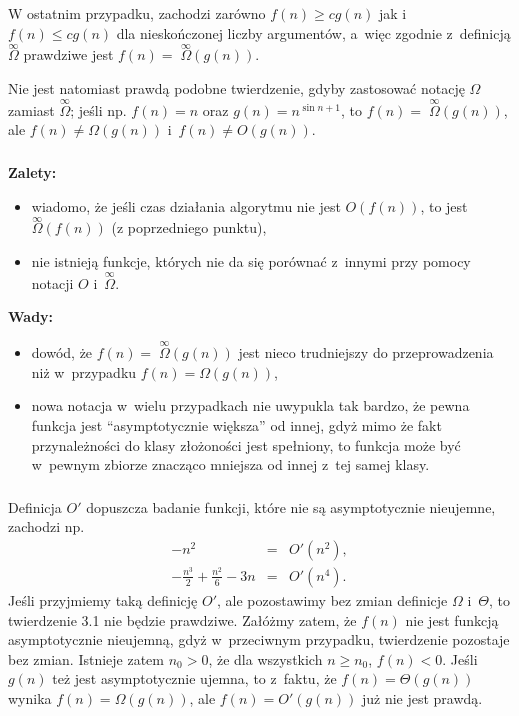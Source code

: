 W ostatnim przypadku, zachodzi zarówno $f(n)\ge cg(n)$ jak i~$f(n)\le cg(n)$ dla nieskończonej liczby argumentów, a~więc zgodnie z~definicją $\stackrel{\infty}{\Omega}$ prawdziwe jest $f(n)=\;\stackrel{\infty}{\Omega}\!\!(g(n))$.

Nie jest natomiast prawdą podobne twierdzenie, gdyby zastosować notację $\Omega$ zamiast $\stackrel{\infty}{\Omega}$; jeśli np. $f(n)=n$ oraz $g(n)=n^{\sin n+1}$, to $f(n)=\;\stackrel{\infty}{\Omega}\!\!(g(n))$, ale $f(n)\ne\Omega(g(n))$ i~$f(n)\ne O(g(n))$.

\subsubsection{} %
\textbf{Zalety:}
\begin{itemize}
	\item wiadomo, że jeśli czas działania algorytmu nie jest $O(f(n))$, to jest $\stackrel{\infty}{\Omega}\!\!(f(n))$ (z poprzedniego punktu),
	\item nie istnieją funkcje, których nie da się porównać z~innymi przy pomocy notacji $O$ i~$\stackrel{\infty}{\Omega}$.
\end{itemize}
\textbf{Wady:}
\begin{itemize}
	\item dowód, że $f(n)=\;\stackrel{\infty}{\Omega}\!\!(g(n))$ jest nieco trudniejszy do przeprowadzenia niż w~przypadku $f(n)=\Omega(g(n))$,
	\item nowa notacja w~wielu przypadkach nie uwypukla tak bardzo, że pewna funkcja jest ``asymptotycznie większa'' od innej, gdyż mimo że fakt przynależności do klasy złożoności jest spełniony, to funkcja może być w~pewnym zbiorze znacząco mniejsza od innej z~tej samej klasy.
\end{itemize}

\subsubsection{} %
Definicja $O'$ dopuszcza badanie funkcji, które nie są asymptotycznie nieujemne, zachodzi np.
\begin{eqnarray*}
	-n^2 &=& O'(n^2), \\
	-\frac{n^3}{2}+\frac{n^2}{6}-3n &=& O'(n^4).
\end{eqnarray*}
Jeśli przyjmiemy taką definicję $O'$, ale pozostawimy bez zmian definicje $\Omega$ i~$\Theta$, to twierdzenie 3.1 nie będzie prawdziwe. Załóżmy zatem, że $f(n)$ nie jest funkcją asymptotycznie nieujemną, gdyż w~przeciwnym przypadku, twierdzenie pozostaje bez zmian. Istnieje zatem $n_0>0$, że dla wszystkich $n\ge n_0$, $f(n)<0$. Jeśli $g(n)$ też jest asymptotycznie ujemna, to z~faktu, że $f(n)=\Theta(g(n))$ wynika $f(n)=\Omega(g(n))$, ale $f(n)=O'(g(n))$ już nie jest prawdą.


